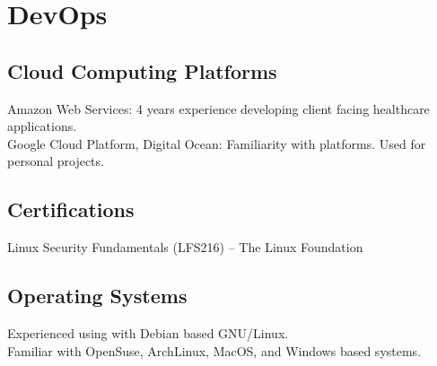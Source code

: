 \section{DevOps}

\subsection{Cloud Computing Platforms}
Amazon Web Services: 4 years experience developing client facing healthcare applications.\\
Google Cloud Platform, Digital Ocean: Familiarity with platforms. Used for personal projects.



\subsection{Certifications}
Linux Security Fundamentals (LFS216) -- The Linux Foundation

\subsection{Operating Systems}
Experienced using with Debian based GNU/Linux.\\
Familiar with OpenSuse, ArchLinux, MacOS, and Windows based systems.
